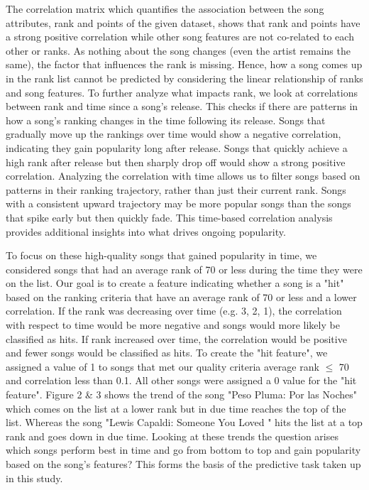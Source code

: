 \documentclass{article}
\begin{document}
The correlation matrix which quantifies the association between the song attributes, rank and points of the given dataset, shows that rank and points have a strong positive correlation while other song features are not co-related to each other or ranks. As nothing about the song changes (even the artist remains the same), the factor that influences the rank is missing. Hence, how a song comes up in the rank list cannot be predicted by considering the linear relationship of ranks and song features. To further analyze what impacts rank, we look at correlations between rank and time since a song's release. This checks if there are patterns in how a song's ranking changes in the time following its release. Songs that gradually move up the rankings over time would show a negative correlation, indicating they gain popularity long after release. Songs that quickly achieve a high rank after release but then sharply drop off would show a strong positive correlation. Analyzing the correlation with time allows us to filter songs based on patterns in their ranking trajectory, rather than just their current rank. Songs with a consistent upward trajectory may be more popular songs than the songs that spike early but then quickly fade. This time-based correlation analysis provides additional insights into what drives ongoing popularity.

To focus on these high-quality songs that gained popularity in time, we considered songs that had an average rank of 70 or less during the time they were on the list. Our goal is to create a feature indicating whether a song is a "hit" based on the ranking criteria that have an average rank of 70 or less and a lower correlation. If the rank was decreasing over time (e.g. 3, 2, 1), the correlation with respect to time would be more negative and songs would more likely be classified as hits. If rank increased over time, the correlation would be positive and fewer songs would be classified as hits. To create the "hit feature", we assigned a value of 1 to songs that met our quality criteria average rank $\leq$ 70 and correlation less than 0.1. All other songs were assigned a 0 value for the "hit feature".
Figure 2 \& 3 shows the trend of the song "Peso Pluma: Por las Noches" which comes on the list at a lower rank but in due time reaches the top of the list. Whereas the song "Lewis Capaldi: Someone You Loved " hits the list at a top rank and goes down in due time. Looking at these trends the question arises which songs perform best in time and go from bottom to top and gain popularity based on the song's features? This forms the basis of the predictive task taken up in this study.
\end{document}
